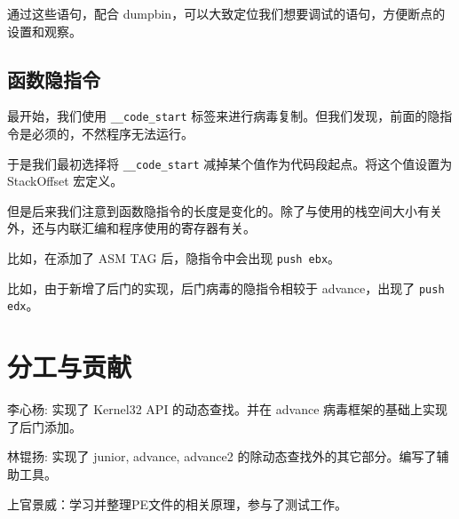 \documentclass[UTF8]{ctexart}
\begin{document}
    通过这些语句，配合 dumpbin，可以大致定位我们想要调试的语句，方便断点的设置和观察。

    \subsection{函数隐指令}

    最开始，我们使用 \lstinline{__code_start} 标签来进行病毒复制。但我们发现，前面的隐指令是必须的，不然程序无法运行。

    于是我们最初选择将 \lstinline{__code_start} 减掉某个值作为代码段起点。将这个值设置为 StackOffset 宏定义。

    但是后来我们注意到函数隐指令的长度是变化的。除了与使用的栈空间大小有关外，还与内联汇编和程序使用的寄存器有关。
    
    比如，在添加了 ASM TAG 后，隐指令中会出现 \lstinline{push ebx}。

    比如，由于新增了后门的实现，后门病毒的隐指令相较于 advance，出现了 \lstinline{push edx}。
 
    \section{分工与贡献}
    
    李心杨: 实现了 Kernel32 API 的动态查找。并在 advance 病毒框架的基础上实现了后门添加。
    
    林锟扬: 实现了 junior, advance, advance2 的除动态查找外的其它部分。编写了辅助工具。
    
    上官景威：学习并整理PE文件的相关原理，参与了测试工作。
    
\end{document}
